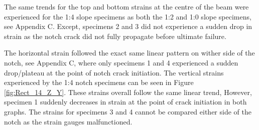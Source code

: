 \documentclass[11pt,a4paper]{article}
\numberwithin{equation}{subsection}
\begin{document}
\pagebreak

\noindent
The same trends for the top and bottom strains at the centre of the beam were experienced for the 1:4 slope specimens as both the 1:2 and 1:0 slope specimens, see Appendix C. Except, specimens 2 and 3 did not experience a sudden drop in strain as the notch crack did not fully propagate before ultimate failure. 

\vspace*{\baselineskip}

\noindent
The horizontal strain followed the exact same linear pattern on wither side of the notch, see Appendix C, where only specimens 1 and 4 experienced a sudden drop/plateau at the point of notch crack initiation. The vertical strains experienced by the 1:4 notch specimens can be seen in Figure \ref{fig:Rect_14_Z_Y}. These strains overall follow the same linear trend, However, specimen 1 suddenly decreases in strain at the point of crack initiation in both graphs. The strains for specimens 3 and 4 cannot be compared either side of the notch as the strain gauges malfunctioned.

\pagebreak
\end{document}
